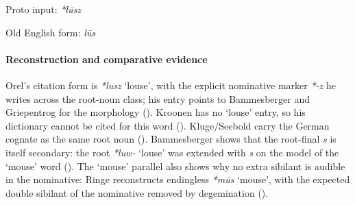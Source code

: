 \documentclass[
  british,
  a4paper,
]{article}
\begin{document}
Proto input: \emph{*lūsz}

\begingroup
\setlength{\fboxsep}{6pt}

\noindent{} \endgroup

Old English form: \emph{lūs}

\paragraph{Reconstruction and comparative
evidence}\label{reconstruction-and-comparative-evidence-46}

Orel's citation form is \emph{*lusz} `louse', with the explicit
nominative marker \emph{*-z} he writes across the root-noun class; his
entry points to Bammesberger and Griepentrog for the morphology
(). Kroonen has no `louse' entry,
so his dictionary cannot be cited for this word
(). Kluge/Seebold carry the
German cognate as the same root noun
(). Bammesberger shows
that the root-final \emph{s} is itself secondary: the root
{\emph{*luw-}} `louse' was extended with \emph{s} on the model of the
`mouse' word ().
The `mouse' parallel also shows why no extra sibilant is audible in the
nominative: Ringe reconstructs endingless {\emph{*mūs}} `mouse', with
the expected double sibilant of the nominative removed by degemination
().
\end{document}
